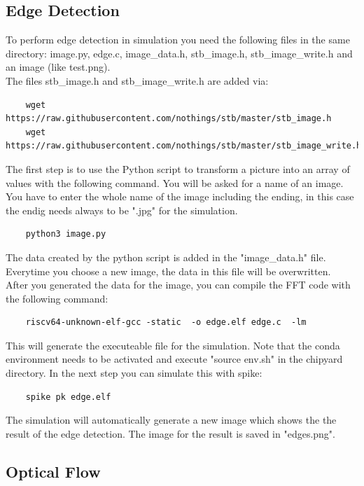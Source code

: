 \documentclass{article}
\begin{document}
{\subsection*{Edge Detection}
To perform edge detection in simulation you need the following files in the same directory: image.py, edge.c, image\_data.h, stb\_image.h, stb\_image\_write.h and an image (like test.png).\\
The files stb\_image.h and stb\_image\_write.h are added via:\\
\begin{lstlisting}
    wget https://raw.githubusercontent.com/nothings/stb/master/stb_image.h
    wget https://raw.githubusercontent.com/nothings/stb/master/stb_image_write.h
\end{lstlisting}
The first step is to use the Python script to transform a picture into an array of values with 
the following command. You will be asked for a name of an image. You have to enter the whole name of the image including the ending, in this case the endig needs always to be ".jpg" for the simulation.\\
\begin{lstlisting}
    python3 image.py
\end{lstlisting} 
The data created by the python script is added in the "image\_data.h" file. Everytime you choose a new image, the data in this file will be overwritten.\\
After you generated the data for the image, you can compile the FFT code with the following command:\\
\begin{lstlisting}
    riscv64-unknown-elf-gcc -static  -o edge.elf edge.c  -lm
\end{lstlisting}
This will generate the executeable file for the simulation. Note that the conda environment needs to be activated and execute "source env.sh" in the chipyard directory. In the next step you can simulate this with spike:\\
\begin{lstlisting}
    spike pk edge.elf
\end{lstlisting}
The simulation will automatically generate a new image which shows the the result of the edge detection. The image for the result is saved in "edges.png".
\subsection*{Optical Flow}

}
\end{document}
